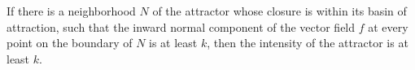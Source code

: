 \begin{conjecture}
	\label{conj:steepness}
	If there is a neighborhood $N$ of the attractor whose closure is within its basin of attraction, such that the inward normal component of the vector field $f$ at every point on the boundary of $N$ is at least $k$, then the intensity of the attractor is at least $k$.
\end{conjecture}


